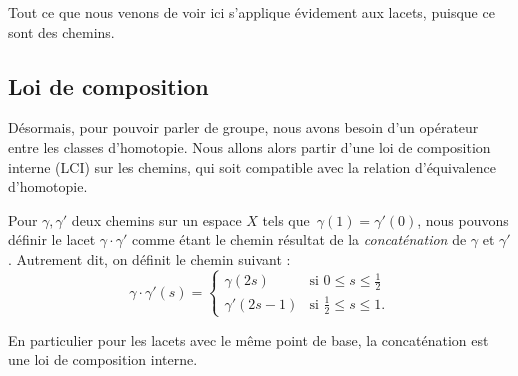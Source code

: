 Tout ce que nous venons de voir ici s'applique évidement aux lacets, puisque ce sont des chemins.

\subsection{Loi de composition}

Désormais, pour pouvoir parler de groupe, nous avons besoin d'un opérateur entre les classes d'homotopie. Nous allons alors partir d'une loi de composition interne (LCI) sur les chemins, qui soit compatible avec la relation d'équivalence d'homotopie.

\begin{figure}
    \centering
\end{figure}

\phantom{}
\begin{definition}
Pour $\gamma,\gamma'$ deux chemins sur un espace $X$ tels que~$\gamma(1)=\gamma'(0)$, nous pouvons définir le lacet $\gamma\cdot\gamma'$ comme étant le chemin résultat de la \emph{concaténation} de $\gamma$ et $\gamma'$. Autrement dit, on définit le chemin suivant : \[\gamma\cdot \gamma'(s)=\left\{\begin{matrix}
\gamma(2s)&\text{si }0\leq s\leq \frac{1}{2}\\ 
\gamma'(2s-1)&\text{si }\frac{1}{2}\leq s\leq 1.
\end{matrix}\right.\]

En particulier pour les lacets avec le même point de base, la concaténation est une loi de composition interne.
\end{definition}

